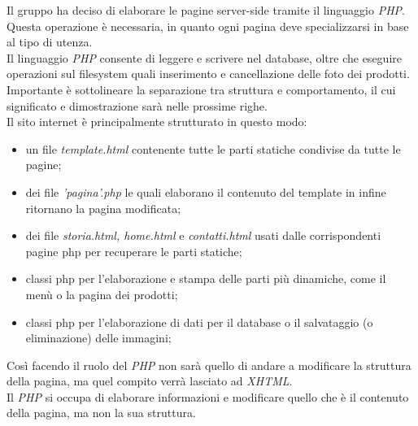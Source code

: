 Il gruppo ha deciso di elaborare le pagine server-side tramite il linguaggio \emph{PHP}. Questa operazione è necessaria, in quanto ogni pagina deve specializzarsi in base 
al tipo di utenza.\\
Il linguaggio \emph{PHP} consente di leggere e scrivere nel database, oltre che eseguire operazioni sul filesystem quali inserimento e cancellazione delle foto dei prodotti.\\
Importante è sottolineare la separazione tra struttura e comportamento, il cui significato e dimostrazione sarà nelle prossime righe.\\
Il sito internet è principalmente strutturato in questo modo: 
\begin{itemize}
    \item un file \emph{template.html} contenente tutte le parti statiche condivise da tutte le pagine;
    \item dei file \emph{'pagina'.php} le quali elaborano il contenuto del template in infine ritornano la pagina modificata;
    \item dei file \emph{storia.html, home.html} e \emph{contatti.html} usati dalle corrispondenti pagine php per recuperare le parti statiche;
    \item classi php per l'elaborazione e stampa delle parti più dinamiche, come il menù o la pagina dei prodotti;
    \item classi php per l'elaborazione di dati per il database o il salvataggio (o eliminazione) delle immagini;
\end{itemize}
Così facendo il ruolo del \emph{PHP} non sarà quello di andare a modificare la struttura della pagina, ma quel compito verrà lasciato ad \emph{XHTML}.\\
Il \emph{PHP} si occupa di elaborare informazioni e modificare quello che è il contenuto della pagina, ma non la sua struttura.\\


